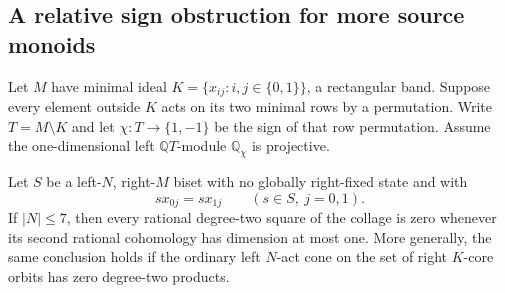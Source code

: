 \subsection{A relative sign obstruction for more source monoids}

\begin{proposition}
\label{CP2:A-row-independent-permutation-source}
Let $M$ have minimal ideal
$K=\{x_{ij}:i,j\in\{0,1\}\}$, a rectangular band.
Suppose every element outside $K$ acts on its two minimal
rows by a permutation.  Write $T=M\setminus K$ and let
$\chi:T\to\{1,-1\}$ be the sign of that row permutation.
Assume the one-dimensional left $\mathbb QT$-module
$\mathbb Q_\chi$ is projective.

Let $S$ be a left-$N$, right-$M$ biset with no globally
right-fixed state and with
\[
 sx_{0j}=sx_{1j}\qquad(s\in S,\ j=0,1).
\]
If $|N|\le7$, then every rational degree-two square of
the collage is zero whenever its second rational
cohomology has dimension at most one.
More generally, the same conclusion holds if the ordinary
left $N$-act cone on the set of right $K$-core orbits has
zero degree-two products.
\end{proposition}
